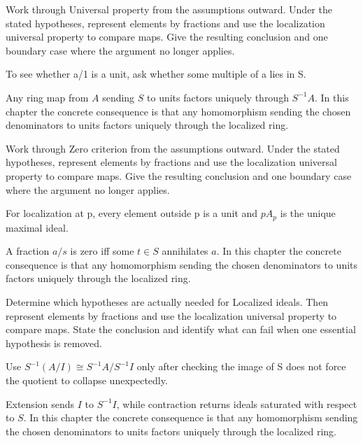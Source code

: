 \begin{exercise}\label{exr:v06-04}
Work through Universal property from the assumptions outward. Under the stated hypotheses, represent elements by fractions and use the localization universal property to compare maps. Give the resulting conclusion and one boundary case where the argument no longer applies.
\end{exercise}
\begin{hint}
To see whether a/1 is a unit, ask whether some multiple of a lies in S.
\end{hint}
\begin{solution}
Any ring map from $A$ sending $S$ to units factors uniquely through $S^{-1}A$. In this chapter the concrete consequence is that any homomorphism sending the chosen denominators to units factors uniquely through the localized ring.
\end{solution}

\begin{exercise}\label{exr:v06-05}
Work through Zero criterion from the assumptions outward. Under the stated hypotheses, represent elements by fractions and use the localization universal property to compare maps. Give the resulting conclusion and one boundary case where the argument no longer applies.
\end{exercise}
\begin{hint}
For localization at p, every element outside p is a unit and \(pA_p\) is the unique maximal ideal.
\end{hint}
\begin{solution}
A fraction $a/s$ is zero iff some $t\in S$ annihilates $a$. In this chapter the concrete consequence is that any homomorphism sending the chosen denominators to units factors uniquely through the localized ring.
\end{solution}

\begin{exercise}\label{exr:v06-06}
Determine which hypotheses are actually needed for Localized ideals. Then represent elements by fractions and use the localization universal property to compare maps. State the conclusion and identify what can fail when one essential hypothesis is removed.
\end{exercise}
\begin{hint}
Use \(S^{-1}(A/I)\cong S^{-1}A/S^{-1}I\) only after checking the image of S does not force the quotient to collapse unexpectedly.
\end{hint}
\begin{solution}
Extension sends $I$ to $S^{-1}I$, while contraction returns ideals saturated with respect to $S$. In this chapter the concrete consequence is that any homomorphism sending the chosen denominators to units factors uniquely through the localized ring.
\end{solution}


